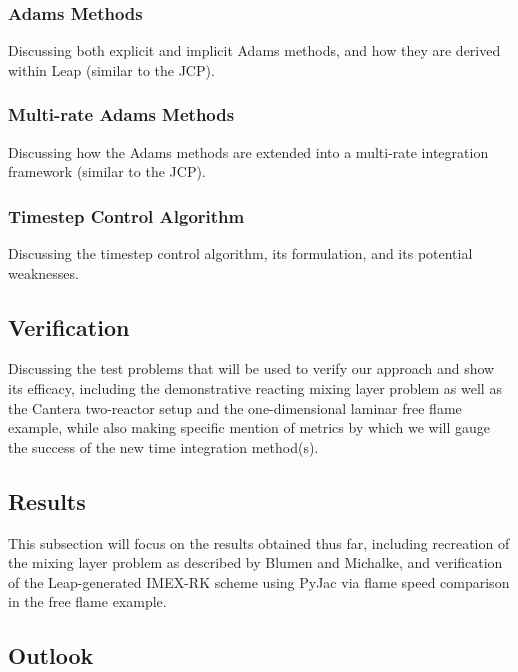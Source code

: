 \subsubsection{Adams Methods}

Discussing both explicit and implicit Adams methods, and
how they are derived within Leap (similar to the JCP).

\subsubsection{Multi-rate Adams Methods}

Discussing how the Adams methods are extended into a
multi-rate integration framework (similar to the JCP).

\subsubsection{Timestep Control Algorithm}

Discussing the timestep control algorithm, its formulation,
and its potential weaknesses.

\subsection{Verification}

Discussing the test problems that will be used to verify our approach
and show its efficacy, including the demonstrative reacting mixing layer
problem as well as the Cantera two-reactor setup and the one-dimensional
laminar free flame example, while also making specific mention of metrics
by which we will gauge the success of the new time integration method(s).

\subsection{Results}

This subsection will focus on the results obtained thus far, including
recreation of the mixing layer problem as described by Blumen and Michalke,
and verification of the Leap-generated IMEX-RK scheme using PyJac via flame
speed comparison in the free flame example.

\subsection{Outlook}


